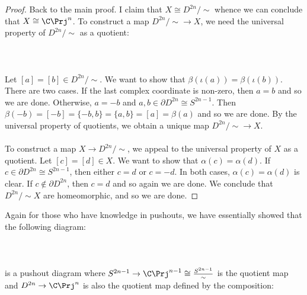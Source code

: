\documentclass[a4paper]{article}
\begin{document}
\begin{prp}{}{}
\begin{proof}
Back to the main proof. I claim that $X\cong D^{2n}/\sim$ whence we can conclude that $X\cong\C\Prj^n$. To construct a map $D^{2n}/\sim\to X$, we need the universal property of $D^{2n}/\sim$ as a quotient: \\~\\
\\~\\
Let $[a]=[b]\in D^{2n}/\sim$. We want to show that $\beta(\iota(a))=\beta(\iota(b))$. There are two cases. If the last complex coordinate is non-zero, then $a=b$ and so we are done. Otherwise, $a=-b$ and $a,b\in\partial D^{2n}\cong S^{2n-1}$. Then $\beta(-b)=[-b]=\{-b,b\}=\{a,b\}=[a]=\beta(a)$ and so we are done. By the universal property of quotients, we obtain a unique map $D^{2n}/\sim\to X$. \\~\\

To construct a map $X\to D^{2n}/\sim$, we appeal to the universal property of $X$ as a quotient. Let $[c]=[d]\in X$. We want to show that $\alpha(c)=\alpha(d)$. If $c\in\partial D^{2n}\cong S^{2n-1}$, then either $c=d$ or $c=-d$. In both cases, $\alpha(c)=\alpha(d)$ is clear. If $c\notin\partial D^{2n}$, then $c=d$ and so again we are done. We conclude that $D^{2n}/\sim X$ are homeomorphic, and so we are done. 
\end{proof}
\end{prp}

Again for those who have knowledge in pushouts, we have essentially showed that the following diagram: \\~\\
\\~\\
is a pushout diagram where $S^{2n-1}\to\C\Prj^{n-1}\cong\frac{S^{2n-1}}{\sim}$ is the quotient map and $D^{2n}\to\C\Prj^n$ is also the quotient map defined by the composition: \\~\\
\\~\\
\end{document}
